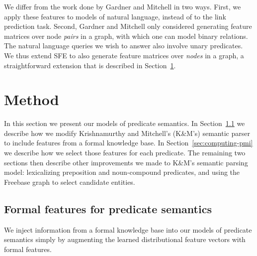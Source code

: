 \documentclass[11pt]{article}
\newcommand{\secref}[1]{Section~\ref{sec:#1}}
\begin{document}
We differ from the work done by Gardner and Mitchell in two ways.
First, we apply these features to models of natural language, instead
of to the link prediction task.  Second, Gardner and Mitchell only
considered generating feature matrices over node \emph{pairs} in a
graph, with which one can model binary relations.  The natural
language queries we wish to answer also involve unary predicates.  We
thus extend SFE to also generate feature matrices over \emph{nodes} in
a graph, a straightforward extension that is described in
\secref{method}.

\section{Method}
\label{sec:method}

In this section we present our models of predicate semantics.  In
\secref{formal-and-distributional} we describe how we modify Krishnamurthy and
Mitchell's (K\&M's) semantic parser to include features from a formal knowledge
base.  In \secref{computing-pmi} we describe how we select those features for
each predicate.  The remaining two sections then describe other improvements we
made to K\&M's semantic parsing model: lexicalizing preposition and
noun-compound predicates, and using the Freebase graph to select candidate
entities.

\subsection{Formal features for predicate semantics}
\label{sec:formal-and-distributional}

We inject information from a formal knowledge base into our models of predicate
semantics simply by augmenting the learned distributional feature vectors with
formal features.
\end{document}

